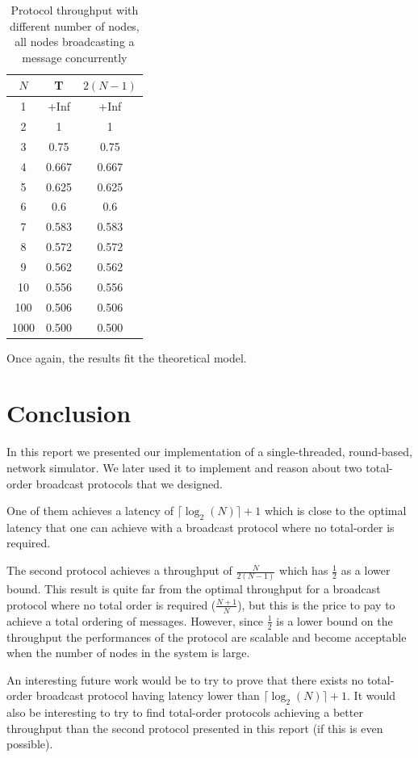 \documentclass[a4paper]{article}
\begin{document}
\begin{table}[H]
    \centering
    \begin{tabular}{|c|c|c|}
        \hline
        $N$   & T      & $2(N-1)$ \\
        \hline
        1     & +Inf   & +Inf   \\
        2     & 1      & 1      \\
        3     & 0.75   &  0.75  \\
        4     & 0.667  & 0.667  \\
        5     & 0.625  & 0.625  \\
        6     & 0.6    &   0.6  \\
        7     & 0.583  & 0.583  \\
        8     & 0.572  & 0.572  \\
        9     & 0.562  & 0.562  \\
        10    & 0.556  & 0.556  \\
        100   & 0.506  & 0.506  \\
        1000  & 0.500  & 0.500  \\
        \hline
    \end{tabular}
    \caption{Protocol throughput with different number of nodes, all nodes broadcasting a message concurrently}
    \label{table:thT}
\end{table}

Once again, the results fit the theoretical model.

\section*{Conclusion}
In this report we presented our implementation of a single-threaded,
round-based, network simulator. We later used it to implement and reason about
two total-order broadcast protocols that we designed.

One of them achieves a latency of $\lceil\log_2(N)\rceil + 1$ which is close
to the optimal latency that one can achieve with a broadcast protocol where no
total-order is required.

The second protocol achieves a throughput of $\frac{N}{2(N-1)}$ which has
$\frac{1}{2}$ as a lower bound. This result is quite far from the optimal
throughput for a broadcast protocol where no total order is required
($\frac{N+1}{N}$), but this is the price to pay to achieve a total ordering
of messages. However, since $\frac{1}{2}$ is a lower bound on the throughput
the performances of the protocol are scalable and become acceptable when
the number of nodes in the system is large.

An interesting future work would be to try to prove that there exists no
total-order broadcast protocol having latency lower than
$\lceil\log_2(N)\rceil + 1$. It would also be interesting to try to find
total-order protocols achieving a better throughput than the second protocol
presented in this report (if this is even possible).
\end{document}

